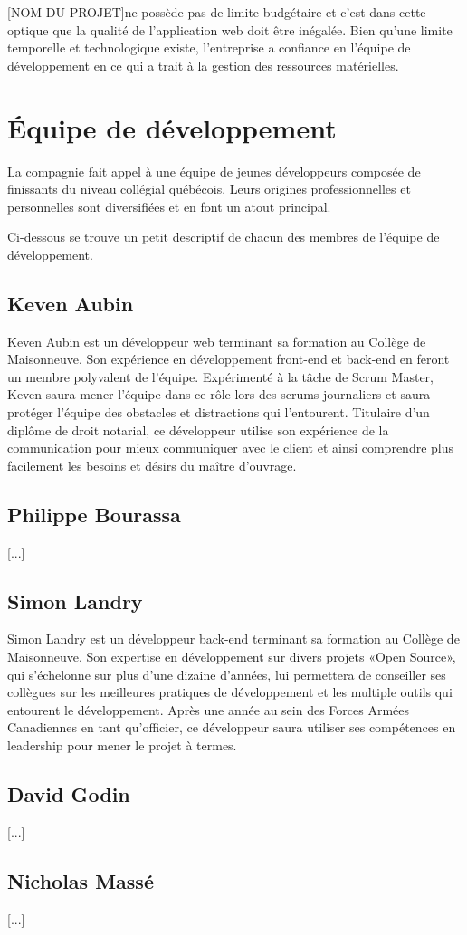 \documentclass{scrreprt}
\def\projectname{[NOM DU PROJET]}
\begin{document}
\projectname ne possède pas de limite budgétaire et c'est dans cette
optique que la qualité de l'application web doit être inégalée. Bien
qu'une limite temporelle et technologique existe, l'entreprise a
confiance en l'équipe de développement en ce qui a trait à la gestion
des ressources matérielles.

\section{Équipe de développement}

La compagnie fait appel à une équipe de jeunes développeurs composée de
finissants du niveau collégial québécois. Leurs origines
professionnelles et personnelles sont diversifiées et en font un atout
principal.

Ci-dessous se trouve un petit descriptif de chacun des membres de
l'équipe de développement.

\subsection{Keven Aubin}

Keven Aubin est un développeur web terminant sa formation au Collège de
Maisonneuve. Son expérience en développement front-end et back-end en
feront un membre polyvalent de l'équipe.
Expérimenté à la tâche de Scrum Master, Keven saura mener l'équipe dans
ce rôle lors des scrums journaliers et saura protéger l'équipe des
obstacles et distractions qui l'entourent.
Titulaire d'un diplôme de droit notarial, ce développeur utilise son
expérience de la communication pour mieux communiquer avec le client et
ainsi comprendre plus facilement les besoins et désirs du maître
d'ouvrage.

\subsection{Philippe Bourassa}

[...]

\subsection{Simon Landry}

Simon Landry est un développeur back-end terminant sa formation au Collège de Maisonneuve.
Son expertise en développement sur divers projets «Open Source», qui s'échelonne sur plus d'une dizaine d'années,
lui permettera de conseiller ses collègues sur les meilleures pratiques de développement et les multiple outils qui entourent le développement.
Après une année au sein des Forces Armées Canadiennes en tant qu'officier, ce développeur saura utiliser ses compétences en leadership pour mener le projet à termes.

\subsection{David Godin}

[...]

\subsection{Nicholas Massé}

[...]
\end{document}

